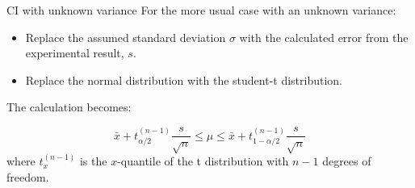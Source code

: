 \begin{frame}{CI with unknown variance}
For the more usual case with an unknown variance:

\begin{itemize}
  \item Replace the assumed standard deviation $\sigma$ with the calculated error from the experimental result, $s$.
  \item Replace the normal distribution with the student-t distribution.
\end{itemize}

The calculation becomes:

\begin{equation*}
\bar{x}+t_{\alpha/2}^{(n-1)}\frac{s}{\sqrt{n}}\leq\mu\leq\bar{x}+t_{1-\alpha/2}^{(n-1)}\frac{s}{\sqrt{n}}
\end{equation*}
\noindent where $t_{x}^{(n-1)}$ is the $x$-quantile of the t distribution with $n-1$ degrees of freedom.
\end{frame}






%

